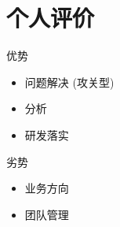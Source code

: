 \documentclass[presentation, bigger]{beamer}
\begin{document}
\section{个人评价}
\label{sec:org8ecf7e4}
\begin{frame}[label={sec:org15b7a3c}]{优势}
\begin{itemize}
\item 问题解决 (攻关型)
\item 分析
\item 研发落实
\end{itemize}
\end{frame}

\begin{frame}[label={sec:org9b579fa}]{劣势}
\begin{itemize}
\item 业务方向
\item 团队管理
\end{itemize}
\end{frame}
\end{document}
